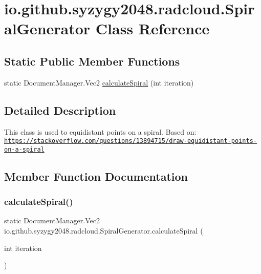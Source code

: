 \hypertarget{classio_1_1github_1_1syzygy2048_1_1radcloud_1_1_spiral_generator}{}\section{io.\+github.\+syzygy2048.\+radcloud.\+Spiral\+Generator Class Reference}
\label{classio_1_1github_1_1syzygy2048_1_1radcloud_1_1_spiral_generator}
\subsection*{Static Public Member Functions}
\begin{DoxyCompactItemize}
\item 
static Document\+Manager.\+Vec2 \mbox{\hyperlink{classio_1_1github_1_1syzygy2048_1_1radcloud_1_1_spiral_generator_afecbb70e7e893866ce0bf01260734f5e}{calculate\+Spiral}} (int iteration)
\end{DoxyCompactItemize}


\subsection{Detailed Description}
This class is used to equidistant points on a spiral. Based on\+: \href{https://stackoverflow.com/questions/13894715/draw-equidistant-points-on-a-spiral}{\tt https\+://stackoverflow.\+com/questions/13894715/draw-\/equidistant-\/points-\/on-\/a-\/spiral} 

\subsection{Member Function Documentation}
\mbox{\label{classio_1_1github_1_1syzygy2048_1_1radcloud_1_1_spiral_generator_afecbb70e7e893866ce0bf01260734f5e}} 
\subsubsection{\texorpdfstring{calculate\+Spiral()}{calculateSpiral()}}
{\footnotesize\ttfamily static Document\+Manager.\+Vec2 io.\+github.\+syzygy2048.\+radcloud.\+Spiral\+Generator.\+calculate\+Spiral (\begin{DoxyParamCaption}\item[{int}]{iteration }\end{DoxyParamCaption})\hspace{0.3cm}{\ttfamily [static]}}

